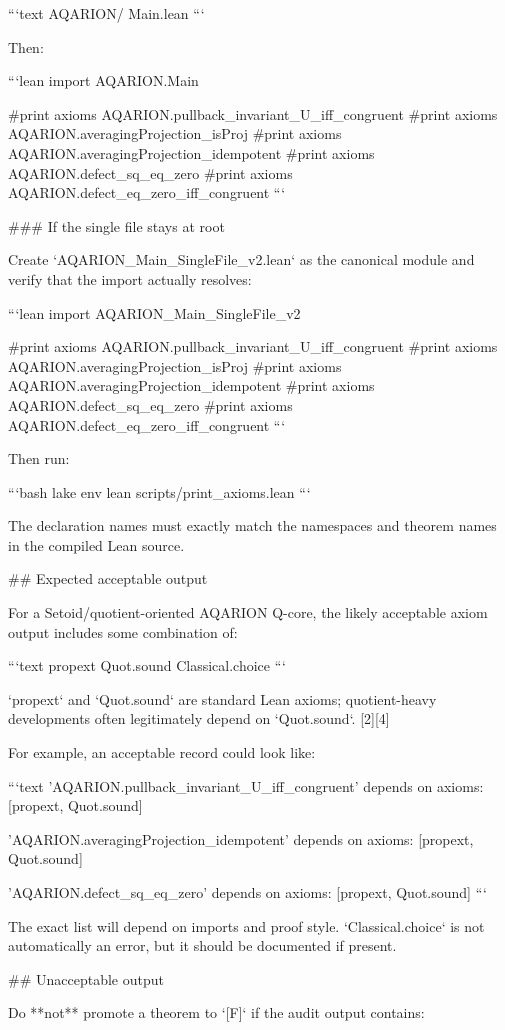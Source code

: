 ```text
AQARION/
  Main.lean
```

Then:

```lean
import AQARION.Main

#print axioms AQARION.pullback_invariant_U_iff_congruent
#print axioms AQARION.averagingProjection_isProj
#print axioms AQARION.averagingProjection_idempotent
#print axioms AQARION.defect_sq_eq_zero
#print axioms AQARION.defect_eq_zero_iff_congruent
```

### If the single file stays at root

Create `AQARION_Main_SingleFile_v2.lean` as the canonical module and verify that the import actually resolves:

```lean
import AQARION_Main_SingleFile_v2

#print axioms AQARION.pullback_invariant_U_iff_congruent
#print axioms AQARION.averagingProjection_isProj
#print axioms AQARION.averagingProjection_idempotent
#print axioms AQARION.defect_sq_eq_zero
#print axioms AQARION.defect_eq_zero_iff_congruent
```

Then run:

```bash
lake env lean scripts/print_axioms.lean
```

The declaration names must exactly match the namespaces and theorem names in the compiled Lean source.

## Expected acceptable output

For a Setoid/quotient-oriented AQARION Q-core, the likely acceptable axiom output includes some combination of:

```text
propext
Quot.sound
Classical.choice
```

`propext` and `Quot.sound` are standard Lean axioms; quotient-heavy developments often legitimately depend on `Quot.sound`. [2][4]

For example, an acceptable record could look like:

```text
'AQARION.pullback_invariant_U_iff_congruent' depends on axioms:
[propext, Quot.sound]

'AQARION.averagingProjection_idempotent' depends on axioms:
[propext, Quot.sound]

'AQARION.defect_sq_eq_zero' depends on axioms:
[propext, Quot.sound]
```

The exact list will depend on imports and proof style. `Classical.choice` is not automatically an error, but it should be documented if present.

## Unacceptable output

Do **not** promote a theorem to `[F]` if the audit output contains:

